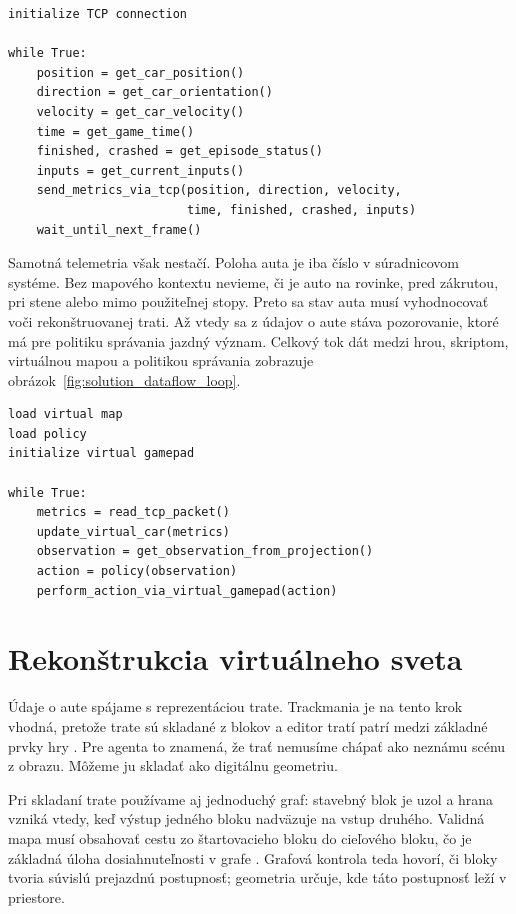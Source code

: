 \begin{lstlisting}[caption={Vysokourovňový pseudokód herného skriptu},label={alg:game_script_tcp}]
initialize TCP connection

while True:
    position = get_car_position()
    direction = get_car_orientation()
    velocity = get_car_velocity()
    time = get_game_time()
    finished, crashed = get_episode_status()
    inputs = get_current_inputs()
    send_metrics_via_tcp(position, direction, velocity,
                         time, finished, crashed, inputs)
    wait_until_next_frame()
\end{lstlisting}

Samotná telemetria však nestačí. Poloha auta je iba číslo v súradnicovom systéme. Bez mapového kontextu nevieme, či je auto na rovinke, pred zákrutou, pri stene alebo mimo použiteľnej stopy. Preto sa stav auta musí vyhodnocovať voči rekonštruovanej trati. Až vtedy sa z údajov o aute stáva pozorovanie, ktoré má pre politiku správania jazdný význam. Celkový tok dát medzi hrou, skriptom, virtuálnou mapou a politikou správania zobrazuje obrázok~\ref{fig:solution_dataflow_loop}.

\begin{lstlisting}[caption={Vysokourovňový pseudokód Python behovej časti},label={alg:python_runtime_loop}]
load virtual map
load policy
initialize virtual gamepad

while True:
    metrics = read_tcp_packet()
    update_virtual_car(metrics)
    observation = get_observation_from_projection()
    action = policy(observation)
    perform_action_via_virtual_gamepad(action)
\end{lstlisting}

\section{Rekonštrukcia virtuálneho sveta}

Údaje o aute spájame s reprezentáciou trate. Trackmania je na tento krok vhodná, pretože trate sú skladané z blokov a editor tratí patrí medzi základné prvky hry \cite{ubisoft_trackmania2026, trackmania_wiki2026}. Pre agenta to znamená, že trať nemusíme chápať ako neznámu scénu z obrazu. Môžeme ju skladať ako digitálnu geometriu.

Pri skladaní trate používame aj jednoduchý graf: stavebný blok je uzol a hrana vzniká vtedy, keď výstup jedného bloku nadväzuje na vstup druhého. Validná mapa musí obsahovať cestu zo štartovacieho bloku do cieľového bloku, čo je základná úloha dosiahnuteľnosti v grafe \cite{cormen2009introduction}. Grafová kontrola teda hovorí, či bloky tvoria súvislú prejazdnú postupnosť; geometria určuje, kde táto postupnosť leží v priestore.

